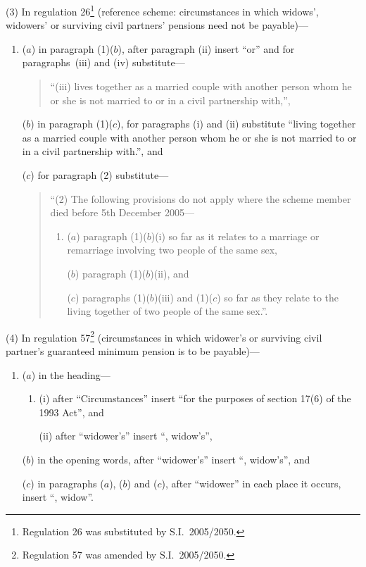 \documentclass[12pt,a4paper]{article}
\begin{document}
(3) In regulation 26\footnote{Regulation 26 was substituted by S.I.~2005/2050.} (reference scheme: circumstances in which widows’, widowers’ or surviving civil partners’ pensions need not be payable)—
\begin{enumerate}\item[]
($a$) in paragraph (1)($b$), after paragraph (ii)  insert “or” and for paragraphs~(iii)  and (iv) substitute—
\begin{quotation}
“(iii) lives together as a married couple with another person whom he or she is not married to or in a civil partnership with,”,
\end{quotation}

($b$) in paragraph (1)($c$), for paragraphs (i)  and (ii)  substitute “living together as a married couple with another person whom he or she is not married to or in a civil partnership with.”, and

($c$) for paragraph (2) substitute—
\begin{quotation}
“(2) The following provisions do not apply where the scheme member died before 5th December 2005—
\begin{enumerate}\item[]
($a$) paragraph (1)($b$)(i)  so far as it relates to a marriage or remarriage involving two people of the same sex,

($b$) paragraph (1)($b$)(ii), and

($c$) paragraphs (1)($b$)(iii)  and (1)($c$)  so far as they relate to the living together of two people of the same sex.”.
\end{enumerate}
\end{quotation}
\end{enumerate}

(4) In regulation 57\footnote{Regulation 57 was amended by S.I.~2005/2050.} (circumstances in which widower’s or surviving civil partner’s guaranteed minimum pension is to be payable)—
\begin{enumerate}\item[]
($a$) in the heading—
\begin{enumerate}\item[]
(i) after “Circumstances” insert “for the purposes of section 17(6) of the 1993 Act”, and

(ii) after “widower’s” insert “, widow’s”,
\end{enumerate}

($b$) in the opening words, after “widower’s” insert “, widow’s”, and

($c$) in paragraphs ($a$), ($b$)  and ($c$), after “widower” in each place it occurs, insert “, widow”.
\end{enumerate}
\end{document}
